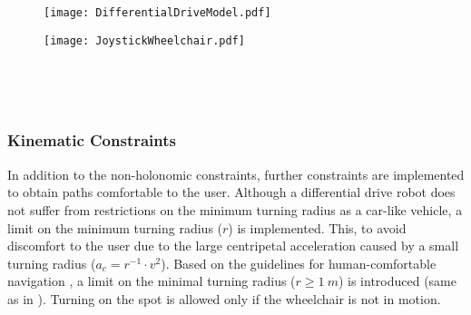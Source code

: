 \begin{figure}[!htbp]
\centering
	\begin{minipage}[b]{.45\linewidth}
		\centering
		\texttt{[image: DifferentialDriveModel.pdf]}
	\end{minipage}
	\hfill%
	\centering
	\begin{minipage}[b]{.5\linewidth}
		\centering
		\texttt{[image: JoystickWheelchair.pdf]}
	\end{minipage}\\[-7pt]
	\begin{minipage}[t]{.45\linewidth}
	\end{minipage}
	\hfill
	\begin{minipage}[t]{.5\linewidth}
	\end{minipage}\\[-14pt]
\end{figure}

\subsubsection{Kinematic Constraints}
In addition to the non-holonomic constraints, further constraints are implemented to obtain paths comfortable to the user. Although a differential drive robot does not suffer from restrictions on the minimum turning radius as a car-like vehicle, a limit on the minimum turning radius ($r$) is implemented. This, to avoid discomfort to the user due to the large centripetal acceleration caused by a small turning radius ($a_c= r^{-1} \cdot v^2$). Based on the guidelines for human-comfortable navigation \cite{MoralesEtAl2013}, a limit on the minimal turning radius ($r \geqslant 1~m$) is introduced (same as in \cite{DemeesterEtAl2003}). Turning on the spot is allowed only if the wheelchair is not in motion.


